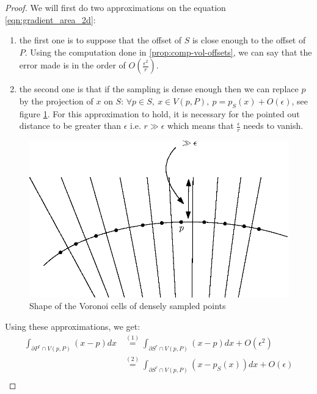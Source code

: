 \begin{proof}
We will first do two approximations on the equation \ref{eqn:gradient_area_2d}:
\begin{enumerate}
    \item the first one is to suppose that the offset of $ S $ is close enough
        to the offset of $ P $. Using the computation done in
        \ref{prop:comp-vol-offsets}, we can say that the error made is in the
        order of $ O(\frac{\epsilon^2}{r}) $.
    \item the second one is that if the sampling is dense enough then we can
        replace $ p $ by the projection of $ x $ on $ S $: $ \forall p \in S,~x
        \in V(p, P),~p = p_S(x) + O(\epsilon) $, see figure
        \ref{fig:voronoi-cylinder}.  For this approximation to hold, it is
        necessary for the pointed out distance to be greater than $ \epsilon $
        i.e. $ r \gg \epsilon $ which means that $ \frac{\epsilon}{r} $ needs to
        vanish.
\end{enumerate}

\begin{figure}[h]
    \centering
    \includegraphics[scale=0.5]{img/voronoi-cylinder}
    \caption{Shape of the Voronoi cells of densely sampled points}
    \label{fig:voronoi-cylinder}
\end{figure}

Using these approximations, we get:
\begin{align*}
    \int_{\partial{P^r} \cap V(p, P)} (x - p) dx & \stackrel{(1)}{=} \int_{\partial{S^r} \cap V(p,
        P)} (x - p) dx + O(\epsilon^2) \\
    &\stackrel{(2)}{=} \int_{\partial{S^r} \cap V(p, P)} (x - p_S(x)) dx +
    O(\epsilon) \\
\end{align*}


\end{proof}

